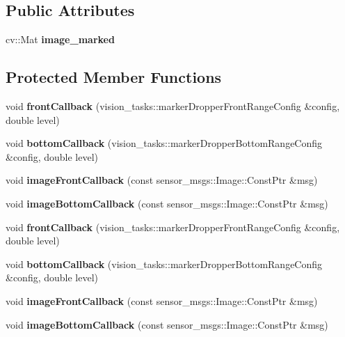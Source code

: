 \subsection*{Public Attributes}
\begin{DoxyCompactItemize}
\item 
\mbox{\label{classMarkerDropper_a596c0798e6b5baf6afb72d0191cfa12c}} 
cv\+::\+Mat {\bfseries image\+\_\+marked}
\end{DoxyCompactItemize}
\subsection*{Protected Member Functions}
\begin{DoxyCompactItemize}
\item 
\mbox{\label{classMarkerDropper_acdf8f8e4b2d8fde47651b3814f20d47d}} 
void {\bfseries front\+Callback} (vision\+\_\+tasks\+::marker\+Dropper\+Front\+Range\+Config \&config, double level)
\item 
\mbox{\label{classMarkerDropper_acbc9da12d06e0bdb7d659982d814c959}} 
void {\bfseries bottom\+Callback} (vision\+\_\+tasks\+::marker\+Dropper\+Bottom\+Range\+Config \&config, double level)
\item 
\mbox{\label{classMarkerDropper_a65a611716c6e3f35510534e4c07080ef}} 
void {\bfseries image\+Front\+Callback} (const sensor\+\_\+msgs\+::\+Image\+::\+Const\+Ptr \&msg)
\item 
\mbox{\label{classMarkerDropper_af1d127a6a637b618cc71d42447a9e8c2}} 
void {\bfseries image\+Bottom\+Callback} (const sensor\+\_\+msgs\+::\+Image\+::\+Const\+Ptr \&msg)
\item 
\mbox{\label{classMarkerDropper_acdf8f8e4b2d8fde47651b3814f20d47d}} 
void {\bfseries front\+Callback} (vision\+\_\+tasks\+::marker\+Dropper\+Front\+Range\+Config \&config, double level)
\item 
\mbox{\label{classMarkerDropper_acbc9da12d06e0bdb7d659982d814c959}} 
void {\bfseries bottom\+Callback} (vision\+\_\+tasks\+::marker\+Dropper\+Bottom\+Range\+Config \&config, double level)
\item 
\mbox{\label{classMarkerDropper_a65a611716c6e3f35510534e4c07080ef}} 
void {\bfseries image\+Front\+Callback} (const sensor\+\_\+msgs\+::\+Image\+::\+Const\+Ptr \&msg)
\item 
\mbox{\label{classMarkerDropper_af1d127a6a637b618cc71d42447a9e8c2}} 
void {\bfseries image\+Bottom\+Callback} (const sensor\+\_\+msgs\+::\+Image\+::\+Const\+Ptr \&msg)
\end{DoxyCompactItemize}
